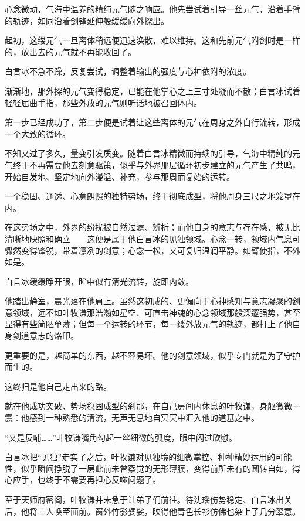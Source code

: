 心念微动，气海中温养的精纯元气随之响应。他先尝试着引导一丝元气，沿着手臂的轨迹，如同沿着剑锋延伸般缓缓向外探出。

起初，这缕元气一旦离体稍远便迅速涣散，难以维持。这和先前元气附剑时是一样的，放出去的元气就不再能收回了。

白言冰不急不躁，反复尝试，调整着输出的强度与心神依附的浓度。

渐渐地，那外探的元气变得稳定，已能在他掌心之上三寸处凝而不散；白言冰试着轻轻屈曲手指，那些外放的元气则听话地被召回体内。

第一步已经成功了，第二步便是试着让这些离体的元气在周身之外自行流转，形成一个大致的循环。

不知又过了多久，量变引发质变。随着白言冰精微而持续的引导，气海中精纯的元气终于不再需要他去刻意驱策，似乎与外界那层循环初步建立的元气产生了共鸣，开始自发地、坚定地向外漫溢、补充，参与那周而复始的运转。

一个稳固、通透、心意朗照的独特势场，终于彻底成型，将他周身三尺之地笼罩在内。

在这势场之中，外界的纷扰被自然过滤、辨析；而他自身的意志与存在感，被无比清晰地映照和确立——这便是属于他白言冰的见独领域。心念一转，领域内气息可骤然变得锋锐，带着凛冽的剑意；心念一松，又可复归温润平静。如臂使指，不外如是。

白言冰缓缓睁开眼，眸中似有清光流转，旋即内敛。

他踏出静室，晨光落在他肩上。虽然这初成的、更偏向于心神感知与意志凝聚的剑意领域，远不如叶牧谦那浩瀚如星空、可直击神魂的心念领域那般深邃强势，甚至显得有些简陋单薄；但每一个运转的环节，每一缕外放元气的轨迹，都打上了他自身剑道意志的烙印。

更重要的是，越简单的东西，越不容易坏。他的剑意领域，似乎专门就是为了守护而生的。

这终归是他自己走出来的路。

\vspace{2em}

就在他成功突破、势场稳固成型的刹那，在自己房间内休息的叶牧谦，身躯微微一震：他感到一种熟悉的清流，无声无息地自冥冥中汇入他的道基之中。

“又是反哺……”叶牧谦嘴角勾起一丝细微的弧度，眼中闪过欣慰。

白言冰把“见独”走实了之后，叶牧谦对见独境的细微掌控、种种精妙运用的可能性，似乎瞬间挣脱了一层此前未曾察觉的无形薄膜，变得前所未有的圆转自如，得心应手，也终于不需要再担心反噬问题了。

\vspace{2em}

至于天师府密阁，叶牧谦并未急于让弟子们前往。待沈瑶伤势稳定、白言冰出关后，他将三人唤至面前。窗外竹影婆娑，映得他青色长衫仿佛也染上了几分翠意。

